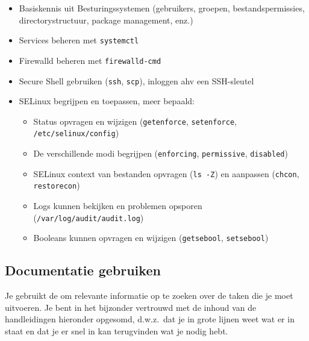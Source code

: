 \begin{itemize}
  \item Basiskennis uit Besturingssystemen (gebruikers, groepen, bestandspermissies, directorystructuur, package management, enz.)
  \item Services beheren met \texttt{systemctl}
  \item Firewalld beheren met \texttt{firewalld-cmd}
  \item Secure Shell gebruiken (\texttt{ssh}, \texttt{scp}), inloggen ahv een SSH-sleutel
  \item SELinux begrijpen en toepassen, meer bepaald:
  
  \begin{itemize}
    \item Status opvragen en wijzigen (\texttt{getenforce}, \texttt{setenforce}, \texttt{/etc/selinux/config})
    \item De verschillende modi begrijpen (\texttt{enforcing}, \texttt{permissive}, \texttt{disabled})
    \item SELinux context van bestanden opvragen (\texttt{ls\ -Z}) en aanpassen (\texttt{chcon}, \texttt{restorecon})
    \item Logs kunnen bekijken en problemen opsporen (\texttt{/var/log/audit/audit.log})
    \item Booleans kunnen opvragen en wijzigen (\texttt{getsebool}, \texttt{setsebool})
  \end{itemize}
\end{itemize}

\subsection{Documentatie gebruiken}%
\label{ssec:documentatie-gebruiken}

Je gebruikt de  om relevante informatie op te zoeken over de taken die je moet uitvoeren. Je bent in het bijzonder vertrouwd met de inhoud van de handleidingen hieronder opgesomd, d.w.z.\ dat je in grote lijnen weet wat er in staat en dat je er snel in kan terugvinden wat je nodig hebt.

